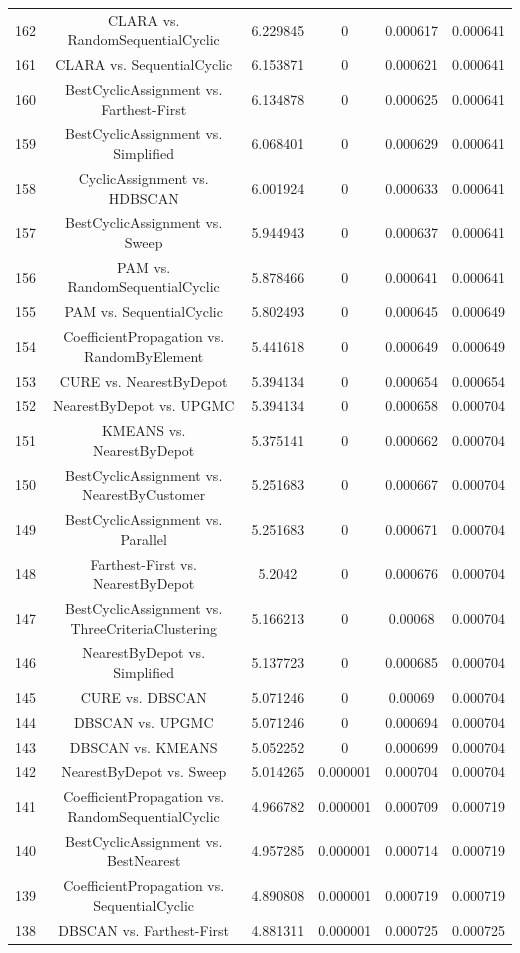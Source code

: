\documentclass[a4paper,10pt]{article}
\begin{document}
\begin{landscape}
\begin{table}[!htp]
\begin{tabular}{cccccc}
162&CLARA vs. RandomSequentialCyclic&6.229845&0&0.000617&0.000641\\
161&CLARA vs. SequentialCyclic&6.153871&0&0.000621&0.000641\\
160&BestCyclicAssignment vs. Farthest-First&6.134878&0&0.000625&0.000641\\
159&BestCyclicAssignment vs. Simplified&6.068401&0&0.000629&0.000641\\
158&CyclicAssignment vs. HDBSCAN&6.001924&0&0.000633&0.000641\\
157&BestCyclicAssignment vs. Sweep&5.944943&0&0.000637&0.000641\\
156&PAM vs. RandomSequentialCyclic&5.878466&0&0.000641&0.000641\\
155&PAM vs. SequentialCyclic&5.802493&0&0.000645&0.000649\\
154&CoefficientPropagation vs. RandomByElement&5.441618&0&0.000649&0.000649\\
153&CURE vs. NearestByDepot&5.394134&0&0.000654&0.000654\\
152&NearestByDepot vs. UPGMC&5.394134&0&0.000658&0.000704\\
151&KMEANS vs. NearestByDepot&5.375141&0&0.000662&0.000704\\
150&BestCyclicAssignment vs. NearestByCustomer&5.251683&0&0.000667&0.000704\\
149&BestCyclicAssignment vs. Parallel&5.251683&0&0.000671&0.000704\\
148&Farthest-First vs. NearestByDepot&5.2042&0&0.000676&0.000704\\
147&BestCyclicAssignment vs. ThreeCriteriaClustering&5.166213&0&0.00068&0.000704\\
146&NearestByDepot vs. Simplified&5.137723&0&0.000685&0.000704\\
145&CURE vs. DBSCAN&5.071246&0&0.00069&0.000704\\
144&DBSCAN vs. UPGMC&5.071246&0&0.000694&0.000704\\
143&DBSCAN vs. KMEANS&5.052252&0&0.000699&0.000704\\
142&NearestByDepot vs. Sweep&5.014265&0.000001&0.000704&0.000704\\
141&CoefficientPropagation vs. RandomSequentialCyclic&4.966782&0.000001&0.000709&0.000719\\
140&BestCyclicAssignment vs. BestNearest&4.957285&0.000001&0.000714&0.000719\\
139&CoefficientPropagation vs. SequentialCyclic&4.890808&0.000001&0.000719&0.000719\\
138&DBSCAN vs. Farthest-First&4.881311&0.000001&0.000725&0.000725\\

\end{tabular}
\end{table}
\end{landscape}
\end{document}
